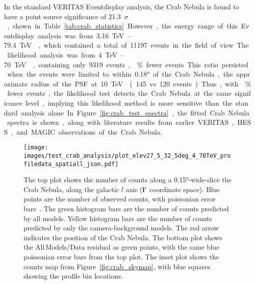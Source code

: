   In the standard VERITAS Eventdisplay analysis, the Crab Nebula is found to have a point source significance of \SI{21.3}{$\sigma$}, shown in Table~\ref{tab:crab_statistics}.
  However, the energy range of this Eventdisplay analysis was from \SIrange{3.16}{79.4}{\TeV{}}, which contained a total of 11197 events in the field of view.
  The likelihood analysis was from \SIrange{4}{70}{\TeV{}}, containing only 9319 events, \% fewer events.
  This ratio persisted when the events were limited to within \ang{0.18} of the Crab Nebula, the approximate radius of the PSF at \SI{10}{\TeV{}} (145 vs 120 events).
  Thus, with \% fewer events, the likelihood test detects the Crab Nebula at the same significance level, implying this likelihood method is more sensitive than the standard analysis alone.
  In Figure~\ref{fig:crab_test_spectra}, the fitted Crab Nebula spectra is shown, along with literature results from earlier VERITAS, HESS, and MAGIC observations of the Crab Nebula.
  
  \begin{figure}[!t]
    \centering
    \texttt{[image: images/test\_crab\_analysis/plot\_elev27\_5\_32\_5deg\_4\_70TeV\_profiledata\_spatiall\_json.pdf]}
    \caption[Crab Nebula Profile along Galactic $l$]
    {
      The top plot shows the number of counts along a \ang{0.15}-wide-slice the Crab Nebula, along the galactic $l$ axis ($\mathbf{l'}$ coordinate space).
      Blue points are the number of observed counts, with poissonian error bars~\cite{poissonfrequentistinterval}.
      The green histogram bars are the number of counts predicted by all models.
      Yellow histogram bars are the number of counts predicted by only the camera-background models.
      The red arrow indicates the position of the Crab Nebula.
      The bottom plot shows the $\mathrm{All\,Models}/\mathrm{Data}$ residual as green points, with the same blue poissonian error bars from the top plot.
      The inset plot shows the counts map from Figure~\ref{fig:crab_skymap}, with blue squares showing the profile bin locations.
    }
    \label{fig:crab_profile_l}
  \end{figure}

